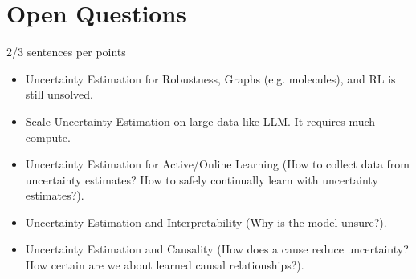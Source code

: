 \section{Open Questions}

2/3 sentences per points

\begin{itemize}
\item Uncertainty Estimation for Robustness, Graphs (e.g. molecules), and RL is still unsolved.
\item Scale Uncertainty Estimation on large data like LLM. It requires much compute.
\item Uncertainty Estimation for Active/Online Learning (How to collect data from uncertainty estimates? How to safely continually learn with uncertainty estimates?).
\item Uncertainty Estimation and Interpretability (Why is the model unsure?).
\item Uncertainty Estimation and Causality (How does a cause reduce uncertainty? How certain are we about learned causal relationships?).
\end{itemize}